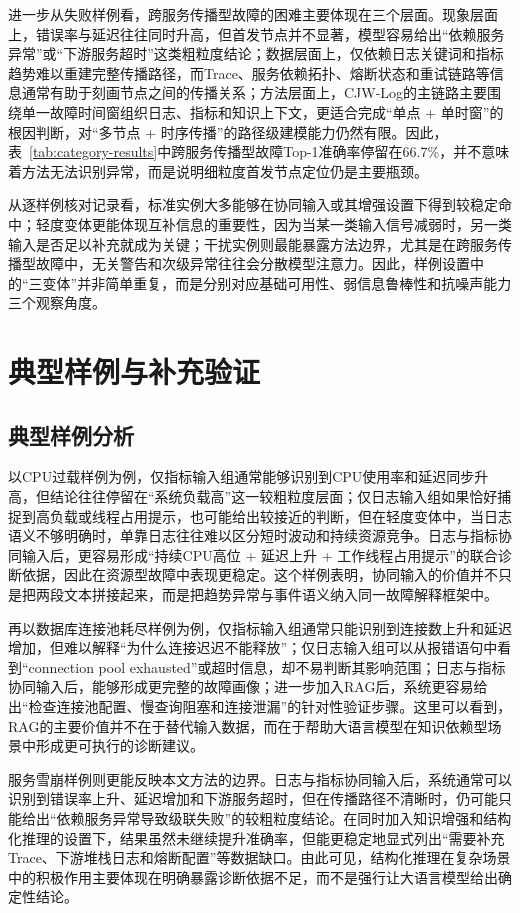进一步从失败样例看，跨服务传播型故障的困难主要体现在三个层面。现象层面上，错误率与延迟往往同时升高，但首发节点并不显著，模型容易给出“依赖服务异常”或“下游服务超时”这类粗粒度结论；数据层面上，仅依赖日志关键词和指标趋势难以重建完整传播路径，而Trace、服务依赖拓扑、熔断状态和重试链路等信息通常有助于刻画节点之间的传播关系；方法层面上，CJW-Log的主链路主要围绕单一故障时间窗组织日志、指标和知识上下文，更适合完成“单点 + 单时窗”的根因判断，对“多节点 + 时序传播”的路径级建模能力仍然有限。因此，表~\ref{tab:category-results}中跨服务传播型故障Top-1准确率停留在66.7\%，并不意味着方法无法识别异常，而是说明细粒度首发节点定位仍是主要瓶颈。

从逐样例核对记录看，标准实例大多能够在协同输入或其增强设置下得到较稳定命中；轻度变体更能体现互补信息的重要性，因为当某一类输入信号减弱时，另一类输入是否足以补充就成为关键；干扰实例则最能暴露方法边界，尤其是在跨服务传播型故障中，无关警告和次级异常往往会分散模型注意力。因此，样例设置中的“三变体”并非简单重复，而是分别对应基础可用性、弱信息鲁棒性和抗噪声能力三个观察角度。

\section{典型样例与补充验证}

\subsection{典型样例分析}

以CPU过载样例为例，仅指标输入组通常能够识别到CPU使用率和延迟同步升高，但结论往往停留在“系统负载高”这一较粗粒度层面；仅日志输入组如果恰好捕捉到高负载或线程占用提示，也可能给出较接近的判断，但在轻度变体中，当日志语义不够明确时，单靠日志往往难以区分短时波动和持续资源竞争。日志与指标协同输入后，更容易形成“持续CPU高位 + 延迟上升 + 工作线程占用提示”的联合诊断依据，因此在资源型故障中表现更稳定。这个样例表明，协同输入的价值并不只是把两段文本拼接起来，而是把趋势异常与事件语义纳入同一故障解释框架中。

再以数据库连接池耗尽样例为例，仅指标输入组通常只能识别到连接数上升和延迟增加，但难以解释“为什么连接迟迟不能释放”；仅日志输入组可以从报错语句中看到“connection pool exhausted”或超时信息，却不易判断其影响范围；日志与指标协同输入后，能够形成更完整的故障画像；进一步加入RAG后，系统更容易给出“检查连接池配置、慢查询阻塞和连接泄漏”的针对性验证步骤。这里可以看到，RAG的主要价值并不在于替代输入数据，而在于帮助大语言模型在知识依赖型场景中形成更可执行的诊断建议。

服务雪崩样例则更能反映本文方法的边界。日志与指标协同输入后，系统通常可以识别到错误率上升、延迟增加和下游服务超时，但在传播路径不清晰时，仍可能只能给出“依赖服务异常导致级联失败”的较粗粒度结论。在同时加入知识增强和结构化推理的设置下，结果虽然未继续提升准确率，但能更稳定地显式列出“需要补充Trace、下游堆栈日志和熔断配置”等数据缺口。由此可见，结构化推理在复杂场景中的积极作用主要体现在明确暴露诊断依据不足，而不是强行让大语言模型给出确定性结论。

